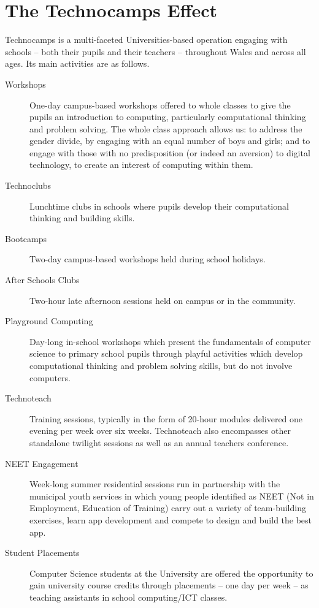 \documentclass{sig-alternate}
\begin{document}
\section{The Technocamps Effect}

Technocamps is a multi-faceted Universities-based
operation engaging with schools -- both their pupils and their teachers --
throughout Wales and across all ages. Its main activities are as follows.

\begin{description}
\item[Workshops]
One-day campus-based workshops offered to whole classes
to give the pupils an introduction to computing,
particularly computational thinking and problem solving.
The whole class approach allows us: to address the gender divide,
by engaging with an equal number of boys and girls;
and to engage with those with no predisposition (or indeed an aversion)
to digital technology, to create an interest of computing within them.
\item[Technoclubs]
Lunchtime clubs in schools where pupils develop
their computational thinking and building skills.
\item[Bootcamps]
Two-day campus-based workshops held during school holidays.
\item[After Schools Clubs]
Two-hour late afternoon sessions held on campus or in the community.
\item[Playground Computing]
Day-long in-school workshops which present
the fundamentals of computer science to primary school pupils
through playful activities which develop computational thinking
and problem solving skills, but do not involve computers.
\item[Technoteach]
Training sessions, typically in the form of 20-hour modules
delivered one evening per week over six weeks.
Technoteach also encompasses other standalone twilight sessions
as well as an annual teachers conference.
\item[NEET Engagement]
Week-long summer residential sessions run in partnership with
the municipal youth services in which young people identified
as NEET (Not in Employment, Education of Training)
carry out a variety of team-building exercises,
learn app development and compete to design and build the best app.
\item[Student Placements]
Computer Science students at the University are offered
the opportunity to gain university course credits through
placements -- one day per week -- as teaching assistants
in school computing/ICT classes.
\end{description}
\end{document}
